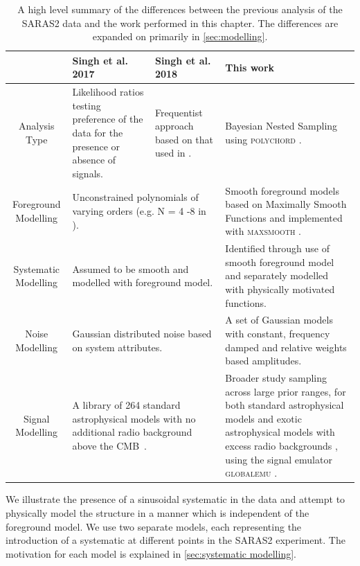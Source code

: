 \begin{landscape}
\begin{table}
    \centering
    \begin{tabular}{|c|p{3cm}|p{4cm}|p{5cm}|}
        \hline
         & Singh et al. 2017\cite{Singh_saras2_2017} & Singh et al. 2018 \cite{Singh_saras2_2018} & This work \\
         \hline
         \hline
         Analysis Type & Likelihood ratios testing preference of the data for the presence or absence of signals. & Frequentist approach based on that used in \cite{Monsalve_EDGES_HB_1_2017}. & Bayesian Nested Sampling using \textsc{polychord} \citep{Handley2015a, Handley2015b}. \\
         \hline
         Foreground Modelling & \multicolumn{2}{p{8cm}|}{Unconstrained polynomials of varying orders (e.g. N = 4 -8 in \citep{Singh_saras2_2018}).} & Smooth foreground models based on Maximally Smooth Functions and implemented with \textsc{maxsmooth} \citep{Bevins_maxsmooth_2021}. \\
         \hline
         Systematic Modelling & \multicolumn{2}{l|}{Assumed to be smooth and modelled with foreground model.} & Identified through use of smooth foreground model and separately modelled with physically motivated functions. \\
         \hline
         Noise Modelling & \multicolumn{2}{l|}{Gaussian distributed noise based on system attributes.} & A set of Gaussian models with constant, frequency damped and relative weights based amplitudes.\\
         \hline
         Signal Modelling & \multicolumn{2}{p{8cm}|}{A library of 264 standard astrophysical models with no additional radio background above the CMB~\citep{Cohen_global_2017}.} & Broader study sampling across large prior ranges, for both standard astrophysical models \citep{Reis_sta_2021} and exotic astrophysical models with excess radio backgrounds \citep{Reis2020}, using the signal emulator \textsc{globalemu} \citep{Bevins_globalemu_2021}. \\
         \hline
    \end{tabular}
    \caption{A high level summary of the differences between the previous analysis of the SARAS2 data and the work performed in this chapter. The differences are expanded on primarily in \cref{sec:modelling}.}
    \label{tab:high_level_summary}
\end{table}
\end{landscape}

We illustrate the presence of a sinusoidal systematic in the data and attempt to physically model the structure in a manner which is independent of the foreground model. We use two separate models, each representing the introduction of a systematic at different points in the SARAS2 experiment. The motivation for each model is explained in \cref{sec:systematic modelling}.

